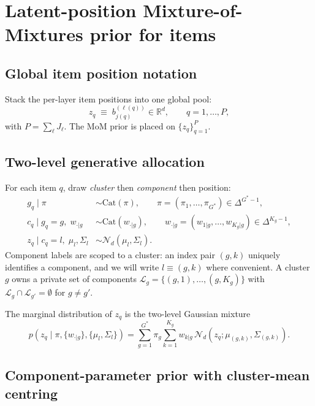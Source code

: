 \documentclass[11pt]{article}
\newcommand{\R}{\mathbb{R}}
\newcommand{\Cat}{\mathrm{Cat}}
\begin{document}
\section{Latent-position Mixture-of-Mixtures prior for items}
\label{sec:mom-prior}

\subsection{Global item position notation}

Stack the per-layer item positions into one global pool:
\begin{equation}
z_q \;\equiv\; b_{j(q)}^{(\ell(q))} \in \R^d,
\qquad q=1,\ldots,P,
\label{eq:zq}
\end{equation}
with $P=\sum_\ell J_\ell$. The MoM prior is placed on $\{z_q\}_{q=1}^P$.

\subsection{Two-level generative allocation}
\label{sec:gen}

For each item $q$, draw \emph{cluster} then \emph{component} then position:
\begin{align}
g_q\mid \pi               &\sim \Cat(\pi),
   \qquad \pi=(\pi_1,\ldots,\pi_{G^*})\in\Delta^{G^*-1}, \label{eq:gq}\\
c_q\mid g_q=g,\;w_{\cdot|g} &\sim \Cat(w_{\cdot|g}),
   \qquad w_{\cdot|g}=(w_{1|g},\ldots,w_{K_g|g})\in\Delta^{K_g-1}, \label{eq:cq}\\
z_q\mid c_q=l,\;\mu_l,\Sigma_l &\sim \mathcal{N}_d(\mu_l,\Sigma_l).\label{eq:zgivenc}
\end{align}
Component labels are scoped to a cluster: an index pair $(g,k)$ uniquely
identifies a component, and we will write $l\equiv(g,k)$ where convenient.
A cluster $g$ owns a private set of components
$\mathcal{L}_g=\{(g,1),\ldots,(g,K_g)\}$ with
$\mathcal{L}_g\cap\mathcal{L}_{g'}=\emptyset$ for $g\ne g'$.

The marginal distribution of $z_q$ is the two-level Gaussian mixture
\begin{equation}
p(z_q\mid \pi,\{w_{\cdot|g}\},\{\mu_l,\Sigma_l\})
 = \sum_{g=1}^{G^*}\pi_g
   \sum_{k=1}^{K_g} w_{k|g}\,
   \mathcal{N}_d(z_q;\mu_{(g,k)},\Sigma_{(g,k)}).
\label{eq:marg-z}
\end{equation}

\subsection{Component-parameter prior with cluster-mean centring}
\label{sec:nwprior}
\end{document}
